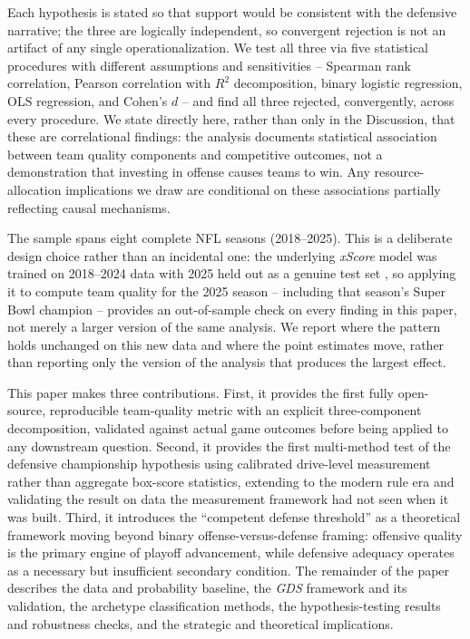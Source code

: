 \documentclass[12pt,a4paper]{article}
\newcommand{\xscore}{\textit{xScore}}
\newcommand{\gds}{\textit{GDS}}
\begin{document}
Each hypothesis is stated so that support would be consistent with the defensive narrative; the three are logically independent, so convergent rejection is not an artifact of any single operationalization. We test all three via five statistical procedures with different assumptions and sensitivities -- Spearman rank correlation, Pearson correlation with $R^2$ decomposition, binary logistic regression, OLS regression, and Cohen's $d$ -- and find all three rejected, convergently, across every procedure. We state directly here, rather than only in the Discussion, that these are correlational findings: the analysis documents statistical association between team quality components and competitive outcomes, not a demonstration that investing in offense causes teams to win. Any resource-allocation implications we draw are conditional on these associations partially reflecting causal mechanisms.

The sample spans eight complete NFL seasons (2018--2025). This is a deliberate design choice rather than an incidental one: the underlying \xscore{} model was trained on 2018--2024 data with 2025 held out as a genuine test set \citep{mecha2026xscore}, so applying it to compute team quality for the 2025 season -- including that season's Super Bowl champion -- provides an out-of-sample check on every finding in this paper, not merely a larger version of the same analysis. We report where the pattern holds unchanged on this new data and where the point estimates move, rather than reporting only the version of the analysis that produces the largest effect.

This paper makes three contributions. First, it provides the first fully open-source, reproducible team-quality metric with an explicit three-component decomposition, validated against actual game outcomes before being applied to any downstream question. Second, it provides the first multi-method test of the defensive championship hypothesis using calibrated drive-level measurement rather than aggregate box-score statistics, extending \citet{robst2011defense} to the modern rule era and validating the result on data the measurement framework had not seen when it was built. Third, it introduces the ``competent defense threshold'' as a theoretical framework moving beyond binary offense-versus-defense framing: offensive quality is the primary engine of playoff advancement, while defensive adequacy operates as a necessary but insufficient secondary condition. The remainder of the paper describes the data and probability baseline, the \gds{} framework and its validation, the archetype classification methods, the hypothesis-testing results and robustness checks, and the strategic and theoretical implications.
\end{document}
